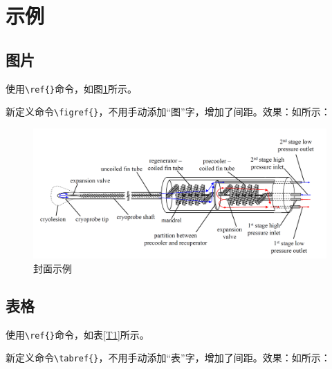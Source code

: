 \section{示例}

\subsection{图片}

使用\verb*|\ref{}|命令，如图\ref{F1}所示。

新定义命令\verb*|\figref{}|，不用手动添加“图”字，增加了间距。效果：如所示：

\begin{figure}[H]
	\centering
	\includegraphics[width=\linewidth]{pics/1}
	\caption{封面示例}\label{F1}
\end{figure}

\subsection{表格}

使用\verb*|\ref{}|命令，如表\ref{T1}所示。

新定义命令\verb*|\tabref{}|，不用手动添加“表”字，增加了间距。效果：如所示：

